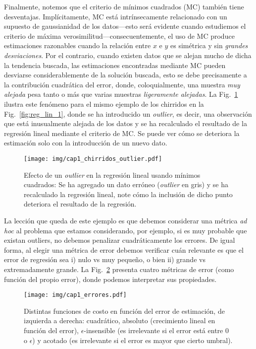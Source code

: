 Finalmente, notemos que el criterio de  mínimos cuadrados (MC) también tiene desventajas. Implícitamente, MC está intrínsecamente relacionado con un supuesto de gaussianidad de los datos---esto será evidente cuando estudiemos el criterio de máxima verosimilitud---consecuentemente, el uso de MC produce estimaciones razonables cuando la relación entre $x$  e $y$ es simétrica y sin \emph{grandes desviaciones}. Por el contrario, cuando existen datos  que se alejan mucho de dicha la tendencia buscada, las estimaciones encontradas mediante MC pueden desviarse considerablemente de la solución buscada, esto se debe precisamente a la contribución cuadrática del error, donde, coloquialmente, una muestra \emph{muy alejada} pesa tanto o más que varias muestras \emph{ligeramente alejadas}. La Fig.~\ref{fig:reg_lin_2} ilustra este fenómeno para el mismo ejemplo de los chirridos en la Fig.~\ref{fig:reg_lin_1}, donde se ha introducido un \emph{outlier}, es decir, una observación que está inusualmente alejada de los datos y se ha recalculado el resultado de la regresión lineal mediante el criterio de MC. Se puede ver cómo se deteriora la estimación solo con la introducción de un nuevo dato. 



\begin{figure}[H]
	\centering
	\texttt{[image: img/cap1\_chirridos\_outlier.pdf]}\\
	\caption{Efecto de un \emph{outlier} en la regresión lineal usando mínimos cuadrados: Se ha agregado un dato erróneo (\emph{outlier} en gris) y se ha recalculado la regresión lineal, note cómo la inclusión de dicho punto deteriora el resultado de la regresión.}
	\label{fig:reg_lin_2}
\end{figure}

La lección que queda de este ejemplo es que debemos considerar una métrica \emph{ad hoc} al problema que estamos considerando, por ejemplo, si es muy probable que existan outliers, no debemos penalizar cuadráticamente los errores. De igual forma, al elegir una métrica de error debemos verificar cuán relevante es que el error de regresión sea i) nulo vs muy pequeño, o bien ii) grande vs extremadamente grande. La Fig.~\ref{fig:reg_lin_err} presenta cuatro métricas de error (como función del propio error), donde podemos interpretar sus propiedades. 

\begin{figure}[H]
	\centering
	\texttt{[image: img/cap1\_errores.pdf]}\\
	\caption{Distintas funciones de costo en función del error de estimación, de izquierda a derecha: cuadrático, absoluto (crecimiento lineal en función del error), $\epsilon$-insensible (es irrelevante si el error está entre 0 o  $\epsilon$) y acotado (es irrelevante si el error es mayor que cierto umbral).}
	\label{fig:reg_lin_err}  
\end{figure}



